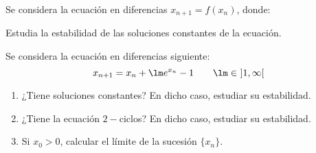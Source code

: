 \documentclass[12pt]{article}
\begin{document}
    \begin{ejercicio}
        Se considera la ecuación en diferencias $x_{n+1} = f(x_n)$, donde:

        Estudia la estabilidad de las soluciones constantes de la ecuación.
    \end{ejercicio}


    \begin{ejercicio}
        Se considera la ecuación en diferencias siguiente:
        \begin{equation*}
            x_{n+1} = x_n + \lm e^{x_n} -1 \qquad \lm \in~]1, \infty[
        \end{equation*}

        \begin{enumerate}
            \item ¿Tiene soluciones constantes? En dicho caso, estudiar su estabilidad.
            \item ¿Tiene la ecuación $2-$ciclos? En dicho caso, estudiar su estabilidad.
            \item Si $x_0>0$, calcular el límite de la sucesión $\{x_n\}$.
        \end{enumerate}
    \end{ejercicio}
\end{document}
